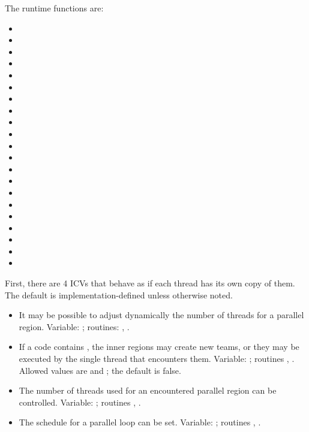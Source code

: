 The runtime functions are:
\begin{itemize}
\item {}
\item {}
\item {}
\item {}
\item {}
\item {}
\item {}
\item {}
\item {}
\item {}
\item {}
\item {}
\item {}
\item {}
\item {}
\item {}
\item {}
\item {}
\item {}
\item {}
\item {}
\end{itemize}

First, there are 4 \acp{ICV} that behave as if each thread has its own copy of them.
The default is implementation-defined unless otherwise noted.
\begin{itemize}
  \item It may be possible to adjust dynamically the number of threads
    for a parallel region. Variable: ;
    routines: ,
    .
  \item If a code contains ,
    the inner regions may create new teams, or they may be executed by
    the single thread that encounters them. Variable:
    ; routines ,
    . Allowed values are  and
    ; the default is false.
  \item The number of threads used for an encountered parallel region
    can be controlled. Variable: ;
    routines ,
    .
  \item The schedule for a parallel loop can be set. Variable:
    ; routines
    , .
\end{itemize}

